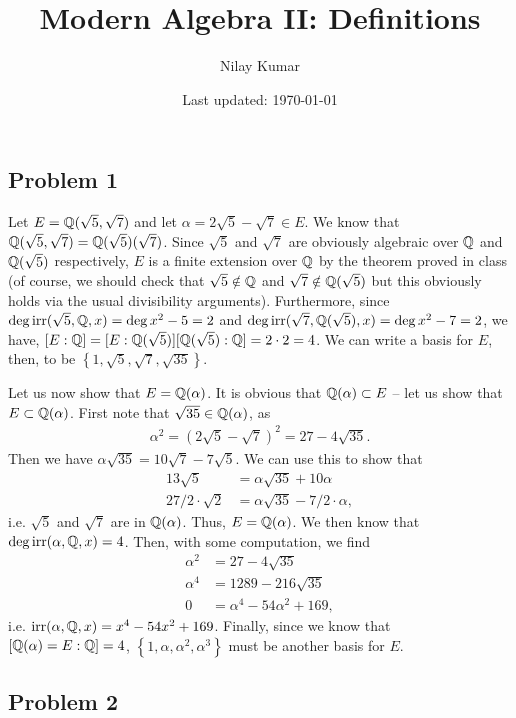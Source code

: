 \documentclass{../../mathnotes}
\title{Modern Algebra II: Definitions}
\author{Nilay Kumar}
\date{Last updated: \today}
\begin{document}
\maketitle

\subsection*{Problem 1}

Let $E=\mathbb{Q}(\sqrt{5},\sqrt{7})$ and let $\alpha=2\sqrt{5}-\sqrt{7}\in E$. We know that $\mathbb{Q}(\sqrt{5},\sqrt{7})=\mathbb{Q}(\sqrt{5})(\sqrt{7})$.
Since $\sqrt{5}$ and $\sqrt{7}$ are obviously algebraic over $\mathbb{Q}$ and $\mathbb{Q}(\sqrt{5})$ respectively, $E$ is a finite extension over
$\mathbb{Q}$ by the theorem proved in class (of course, we should check that $\sqrt{5}\notin\mathbb{Q}$ and $\sqrt{7}\notin\mathbb{Q}(\sqrt{5})$ but this obviously holds
via the usual divisibility arguments). Furthermore, since $\deg\operatorname{irr}(\sqrt{5},\mathbb{Q},x)=\deg x^2-5=2$ and $\deg\operatorname{irr}(\sqrt{7},\mathbb{Q}(\sqrt{5}),x)=\deg x^2-7=2$,
we have, $[E:\mathbb{Q}]=[E:\mathbb{Q}(\sqrt{5})][\mathbb{Q}(\sqrt{5}):\mathbb{Q}]=2\cdot2=4$. We can write a basis for $E$, then, to be $\left\{1,\sqrt{5},\sqrt{7},\sqrt{35}\right\}$.

Let us now show that $E=\mathbb{Q}(\alpha)$. It is obvious that $\mathbb{Q}(\alpha)\subset E$ -- let us show that $E\subset \mathbb{Q}(\alpha)$. First note that
$\sqrt{35}\in\mathbb{Q}(\alpha)$, as
\begin{align*}
    \alpha^2=(2\sqrt{5}-\sqrt{7})^2=27-4\sqrt{35}.
\end{align*}
Then we have $\alpha\sqrt{35}=10\sqrt{7}-7\sqrt{5}$. We can use this to show that
\begin{align*}
    13\sqrt{5}&=\alpha\sqrt{35}+10\alpha\\
    27/2\cdot\sqrt{2}&=\alpha\sqrt{35}-7/2\cdot\alpha,
\end{align*}
i.e. $\sqrt{5}$ and $\sqrt{7}$ are in $\mathbb{Q}(\alpha)$. Thus, $E=\mathbb{Q}(\alpha)$. We then know that $\deg\operatorname{irr}(\alpha,\mathbb{Q},x)=4$. Then, with some computation,
we find
\begin{align*}
    \alpha^2&=27-4\sqrt{35}\\
    \alpha^4&=1289-216\sqrt{35}\\
    0&=\alpha^4-54\alpha^2+169,
\end{align*}
i.e. $\operatorname{irr}(\alpha,\mathbb{Q},x)=x^4-54x^2+169$. Finally, since we know that $[\mathbb{Q}(\alpha)=E:\mathbb{Q}]=4$, $\left\{ 1,\alpha,\alpha^2,\alpha^3 \right\}$ must
be another basis for $E$.

\subsection*{Problem 2}
\end{document}
